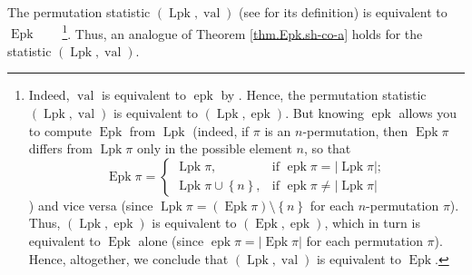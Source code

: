\documentclass[numbers=enddot,12pt,final,onecolumn,notitlepage]{scrartcl}%
\theoremstyle{definition}
\begin{document}
The permutation statistic $\left(  \operatorname*{Lpk},\operatorname*{val}%
\right)  $ (see \cite{part1} for its definition) is equivalent to
$\operatorname*{Epk}$\ \ \ \ \footnote{Indeed, $\operatorname*{val}$ is
equivalent to $\operatorname*{epk}$ by \cite[Lemma 2.1 \textbf{(e)}]{part1}.
Hence, the permutation statistic $\left(  \operatorname*{Lpk}%
,\operatorname*{val}\right)  $ is equivalent to $\left(  \operatorname*{Lpk}%
,\operatorname*{epk}\right)  $. But knowing $\operatorname*{epk}$ allows you
to compute $\operatorname*{Epk}$ from $\operatorname*{Lpk}$ (indeed, if $\pi$
is an $n$-permutation, then $\operatorname*{Epk}\pi$ differs from
$\operatorname*{Lpk}\pi$ only in the possible element $n$, so that
\[
\operatorname*{Epk}\pi=%
\begin{cases}
\operatorname*{Lpk}\pi, & \text{if }\operatorname*{epk}\pi=\left\vert
\operatorname*{Lpk}\pi\right\vert ;\\
\operatorname*{Lpk}\pi\cup\left\{  n\right\}  , & \text{if }%
\operatorname*{epk}\pi\neq\left\vert \operatorname*{Lpk}\pi\right\vert
\end{cases}
\]
) and vice versa (since $\operatorname*{Lpk}\pi=\left(  \operatorname*{Epk}%
\pi\right)  \setminus\left\{  n\right\}  $ for each $n$-permutation $\pi$).
Thus, $\left(  \operatorname*{Lpk},\operatorname*{epk}\right)  $ is equivalent
to $\left(  \operatorname*{Epk},\operatorname*{epk}\right)  $, which in turn
is equivalent to $\operatorname*{Epk}$ alone (since $\operatorname*{epk}%
\pi=\left\vert \operatorname*{Epk}\pi\right\vert $ for each permutation $\pi
$). Hence, altogether, we conclude that $\left(  \operatorname*{Lpk}%
,\operatorname*{val}\right)  $ is equivalent to $\operatorname*{Epk}$.}. Thus,
an analogue of Theorem \ref{thm.Epk.sh-co-a} holds for the statistic $\left(
\operatorname*{Lpk},\operatorname*{val}\right)  $.
\end{document}
